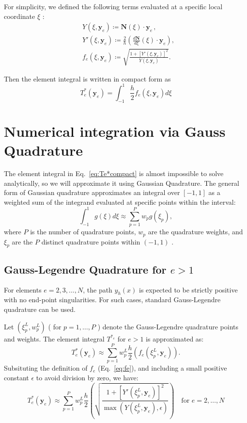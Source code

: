 \documentclass[11pt]{article}
\begin{document}
For simplicity, we defined the following terms evaluated at a specific local coordinate \( \xi \) :  
\begin{align}
    &Y(\xi, \mathbf{y}_e) \coloneqq \mathbf{N}(\xi) \cdot \mathbf{y}_e \, , \\ 
    &Y'(\xi, \mathbf{y}_e) \coloneqq \frac{2}{h} \left( \frac{d\mathbf{N}}{d\xi}(\xi) \cdot \mathbf{y}_e \right) , \\ 
    &f_e(\xi, \mathbf{y}_e) \coloneqq \sqrt{\frac{1 + [Y'(\xi, \mathbf{y}_e)]^2}{Y(\xi, \mathbf{y}_e)}}. \label{eq:fe}
\end{align}

Then the element integral is written in compact form as  
\begin{equation}
    T_e^*(\mathbf{y}_e) = \int_{-1}^{1}  \frac{h}{2} f_e(\xi, \mathbf{y}_e) d\xi \label{eq:Te*compact}
\end{equation}

\section{Numerical integration via Gauss Quadrature}
The element integral in Eq.~\eqref{eq:Te*compact} is almost impossible to solve analytically, so we will approximate it using Gaussian Quadrature. The general form of Gaussian quadrature approximates an integral over \( \left[-1,1\right] \) as a weighted sum of the integrand evaluated at specific points within the interval:  
\[ 
    \int_{-1}^{1} g(\xi) d\xi \approx \sum_{p=1}^{P} w_p g(\xi_p) ,
\]
where \(P\) is the number of quadrature points, \(w_p\) are the quadrature weights, and \(\xi_p\) are the \( P \) distinct quadrature points within \( \left(-1,1\right) \) .

\subsection{Gauss-Legendre Quadrature for \( e > 1 \) }

For elements \( e = 2, 3, ..., N \), the path \(y_h(x) \)  is expected to be strictly positive with no end-point singularities. For such cases, standard Gauss-Legendre quadrature can be used. 

Let \( (\xi_{p}^{L}, w_{p}^{L}) \) ( for \( p = 1, \dots, P \) ) denote the Gauss-Legendre quadrature points and weights. The element integral \( T^{*_e}  \) for \( e > 1 \) is approximated as:  
\[ 
    T_e^*(\mathbf{y}_e) \approx \sum_{p=1}^{P} w_{p}^{L} \frac{h}{2} \left( f_e(\xi_{p}^{L}, \mathbf{y}_e)  \right).
\]
Subsituting the definition of \( f_e \) (Eq.~\eqref{eq:fe}), and including a small positive constant \( \epsilon \) to avoid division by zero, we have: 
\begin{equation}
    T_e^*(\mathbf{y}_e) \approx \sum_{p=1}^{P} w_{p}^{L} \frac{h}{2}  \left( \sqrt{\frac{1 + [Y'(\xi_{p}^{L}, \mathbf{y}_e)]^2}{ \max(Y(\xi_{p}^{L}, \mathbf{y}_e), \epsilon) }} \right) \quad \text{for } e = 2, \ldots, N \label{eq:Te*approx}
\end{equation}
\end{document}
